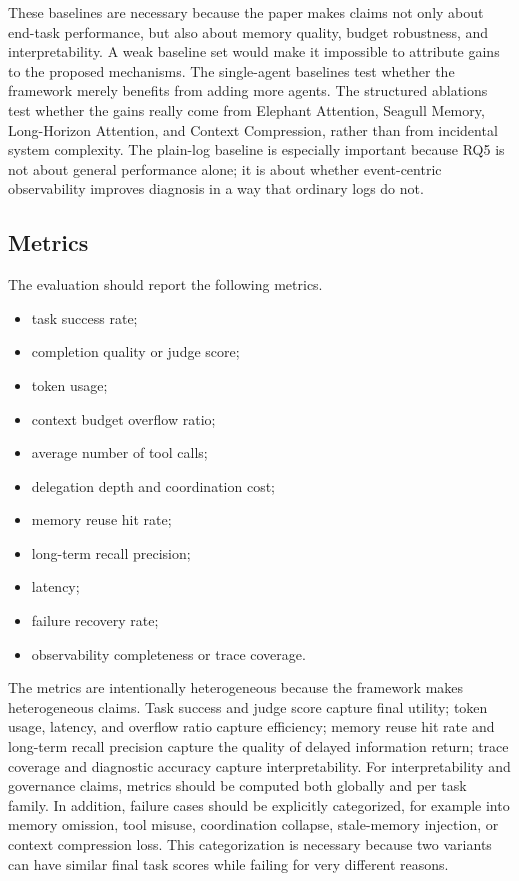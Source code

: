 \documentclass[a4paper,fleqn]{cas-sc}
\begin{document}
These baselines are necessary because the paper makes claims not only about end-task performance, but also about memory quality, budget robustness, and interpretability. A weak baseline set would make it impossible to attribute gains to the proposed mechanisms. The single-agent baselines test whether the framework merely benefits from adding more agents. The structured ablations test whether the gains really come from Elephant Attention, Seagull Memory, Long-Horizon Attention, and Context Compression, rather than from incidental system complexity. The plain-log baseline is especially important because RQ5 is not about general performance alone; it is about whether event-centric observability improves diagnosis in a way that ordinary logs do not.

\subsection{Metrics}

The evaluation should report the following metrics.
\begin{itemize}
\item task success rate;
\item completion quality or judge score;
\item token usage;
\item context budget overflow ratio;
\item average number of tool calls;
\item delegation depth and coordination cost;
\item memory reuse hit rate;
\item long-term recall precision;
\item latency;
\item failure recovery rate;
\item observability completeness or trace coverage.
\end{itemize}

The metrics are intentionally heterogeneous because the framework makes heterogeneous claims. Task success and judge score capture final utility; token usage, latency, and overflow ratio capture efficiency; memory reuse hit rate and long-term recall precision capture the quality of delayed information return; trace coverage and diagnostic accuracy capture interpretability. For interpretability and governance claims, metrics should be computed both globally and per task family. In addition, failure cases should be explicitly categorized, for example into memory omission, tool misuse, coordination collapse, stale-memory injection, or context compression loss. This categorization is necessary because two variants can have similar final task scores while failing for very different reasons.
\end{document}
